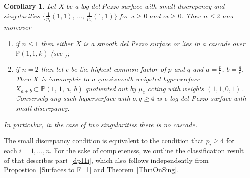 \documentclass[12pt,a4paper]{book}      %
\newtheorem{cor}[thm]{Corollary}
\theoremstyle{definition}
\newcommand{\mb}[1]{\mathbb{#1}}
\renewcommand{\P}{\mathrm{P}}
\begin{document}
\begin{cor}\label{LengthOne}
Let $X$ be a log del Pezzo surface with small discrepancy and singularities  $\{ \frac{1}{p_1}(1,1), \, \dots, \, \frac{1}{p_n}(1,1) \}$
for $n\ge0$ and $m\ge0$. Then $n\le2$ and moreover
\begin{enumerate}
\item\label{dp11i}
if $n\le1$ then either $X$ is a smooth del Pezzo surface or 
lies in a cascade over $\P(1,1,k)$ (see \cite{CP});
\item\label{dp11ii}
if $n=2$ then let $c$ be the highest common factor of $p$ and $q$ and $a = \frac{p}{c}$, $b = \frac{q}{c}$. Then $X$
is isomorphic to a quasismooth weighted hypersurface
$X_{a+b}\subset \mb{P}(1,\,1,\,a,\,b)$ quotiented out by $\mu_c$ acting with weights $(1,1,0,1)$. Conversely any such hypersurface with $p,q\ge4$ is
a log del Pezzo surface with small discrepancy.
\end{enumerate}
In particular, in the case of two singularities there is no cascade.
\end{cor}

The small discrepancy condition is equivalent to the condition that
$p_i \geq 4$ for each $i=1,\dots,n$. 
For the sake of completeness, we outline the classification result of \cite{CP} that
describes part~\ref{dp11i}, which also follows independently from Propostion~\ref{Surfaces to F_1} and Theorem~\ref{ThmOnSing}.
\end{document}
